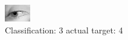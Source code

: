 \begin{figure}[h!]
\begin{center}
\includegraphics[width=0.60\columnwidth]{figures/ID3047_class_3_target_4.png}
\end{center}
\caption{ Classification: 3 actual target: 4}
\label{fig:ID3047_class_3_target_4}
\end{figure}
